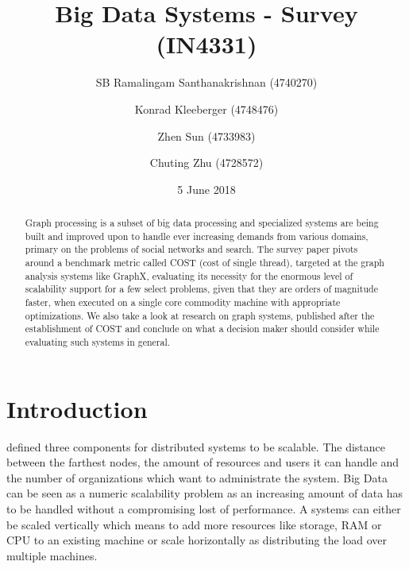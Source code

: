 \documentclass{format}
\begin{document}
\title{Big Data Systems - Survey (IN4331)}


\author{
    SB Ramalingam Santhanakrishnan (4740270)\\ 
%
\and Konrad Kleeberger (4748476)\\ 
%
\and Zhen Sun (4733983)\\ 
%
\and Chuting Zhu (4728572)\\ 
}

\date{5 June 2018}

\maketitle

\begin{abstract}

    Graph processing is a subset of big data processing and specialized systems are being built and improved upon to handle ever increasing demands from various domains, primary on the problems of social networks and search. The survey paper pivots around a benchmark metric called COST (cost of single thread), targeted at the graph analysis systems like GraphX, evaluating its necessity for the enormous level of scalability support for a few select problems, given that they are orders of magnitude faster, when executed on a single core commodity machine with appropriate optimizations. We also take a look at research on graph systems, published after the establishment of COST and conclude on what a decision maker should consider while evaluating such systems in general.

\end{abstract}

\section{Introduction}

\citeauthor{neuman_scale_1994} defined three components for distributed systems to be scalable. The distance between the farthest nodes, the amount of resources and users it can handle and the number of organizations which want to administrate the system. Big Data can be seen as a numeric scalability problem as an increasing amount of data has to be handled without a compromising lost of performance. A systems can either be scaled vertically which means to add more resources like storage, RAM or CPU to an existing machine or scale horizontally as distributing the load over multiple machines.
\end{document}
